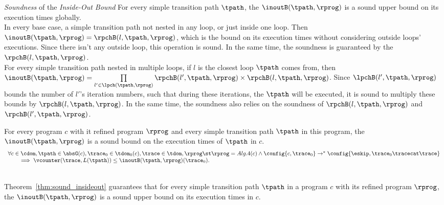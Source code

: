 \emph{Soundness} of the \emph{Inside-Out Bound}  
For every simple transition path $\tpath$, the $\inoutB(\tpath, \rprog)$
is a sound upper bound on its execution times globally.
\\
In every base case, a simple transition path not nested in any loop, or just inside one loop.
Then $\inoutB(\tpath, \rprog) = \rpchB(l, \tpath, \rprog)$, which is the bound on its execution times without considering
outside loops' executions. Since there isn't any outside loop, this operation is sound.
In the same time, the soundness is guaranteed by the $\rpchB(l, \tpath, \rprog)$.
\\
For every simple transition path nested in multiple loops, if $l$ is the closest loop $\tpath$ comes from, then
$\inoutB(\tpath, \rprog) =
\prod\limits_{l' \in \lpch(\tpath, \rprog)} \rpchB(l', \tpath, \rprog) \times \rpchB(l, \tpath, \rprog)$.
Since $\lpchB(l', \tpath, \rprog)$ bounds the number of $l'$'s iteration numbers,
such that during these iterations, the $\tpath$ will be executed,
it is sound to multiply these bounds by $\rpchB(l, \tpath, \rprog)$.
In the same time, the soundness also relies on the soundness of $\rpchB(l, \tpath, \rprog)$ and $\rpchB(l', \tpath, \rprog)$. 
%
\begin{thm}
  \label{thm:sound_insideout}
  For every program $c$ with it refined program $\rprog$ and 
  every simple transition path $\tpath$ in this program,
   the $\inoutB(\tpath, \rprog)$
is a sound bound on the execution times of $\tpath$ in $c$.
  \[
    \begin{array}{l}
    \forall c \in \cdom, \tpath \in \absG(c), \trace_0 \in \tdom_0(c), \trace \in \tdom, \rprog \st 
    \rprog = Alg.4(c)
    \land
    \config{c, \trace_0} \to^* 
    \config{{\eskip, \trace_0 \tracecat \trace}}
    \\ \qquad
    \implies
    \vcounter(\trace, L(\tpath)) \leq \inoutB(\tpath, \rprog)(\trace_0).
    \end{array}
    \]
\end{thm}
\\
Theorem~\ref{thm:sound_insideout} guarantees that
for every simple transition path $\tpath$ in a program $c$ with its refined program $\rprog$,
the $\inoutB(\tpath, \rprog)$
is a sound upper bound on its execution times in $c$.
%
